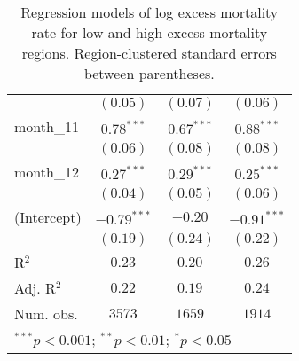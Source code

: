 \begin{table}
\begin{center}
\begin{tabular}{l c c c}
               & $(0.05)$      & $(0.07)$      & $(0.06)$      \\
month\_11      & $0.78^{***}$  & $0.67^{***}$  & $0.88^{***}$  \\
               & $(0.06)$      & $(0.08)$      & $(0.08)$      \\
month\_12      & $0.27^{***}$  & $0.29^{***}$  & $0.25^{***}$  \\
               & $(0.04)$      & $(0.05)$      & $(0.06)$      \\
(Intercept)    & $-0.79^{***}$ & $-0.20$       & $-0.91^{***}$ \\
               & $(0.19)$      & $(0.24)$      & $(0.22)$      \\
\hline
R$^2$          & $0.23$        & $0.20$        & $0.26$        \\
Adj. R$^2$     & $0.22$        & $0.19$        & $0.24$        \\
Num. obs.      & $3573$        & $1659$        & $1914$        \\
\hline
\multicolumn{4}{l}{\scriptsize{$^{***}p<0.001$; $^{**}p<0.01$; $^{*}p<0.05$}}
\end{tabular}
\caption{Regression models of log excess mortality rate for low and high excess mortality regions. Region-clustered standard errors between parentheses.}
\label{tab:hilomodels}
\end{center}
\end{table}
